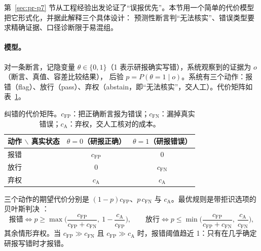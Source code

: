 第~\ref{sec:pr-p7} 节从工程经验出发论证了“误报优先”。本节用一个简单的代价模型把它形式化，并据此解释三个具体设计：
预测性断言判“无法核实”、错误类型要求精确证据、口径诊断限于易混组。

\paragraph{模型。}对一条断言，记隐变量 $\theta\in\{0,1\}$（1 表示研报确实写错），系统观察到的证据为 $o$（断言、真值、容差比较结果），
后验 $p=P(\theta=1\mid o)$。系统有三个动作：报错（flag）、放行（pass）、弃权（abstain，即“无法核实”，交人工）。代价矩阵如表~\ref{tab:rc-cost}。

\begin{table}[t]
\centering
\caption{纠错的代价矩阵。$c_{\text{FP}}$：把正确断言报为错误；$c_{\text{FN}}$：漏掉真实错误；$c_{\text{A}}$：弃权，交人工核对的成本。}
\label{tab:rc-cost}
\small
\begin{tabular}{@{}lcc@{}}
\toprule
动作 $\backslash$ 真实状态 & $\theta=0$（研报正确） & $\theta=1$（研报错误） \\
\midrule
报错 & $c_{\text{FP}}$ & 0 \\
放行 & 0 & $c_{\text{FN}}$ \\
弃权 & $c_{\text{A}}$ & $c_{\text{A}}$ \\
\bottomrule
\end{tabular}
\end{table}

三个动作的期望代价分别是 $(1-p)c_{\text{FP}}$、$p\,c_{\text{FN}}$ 与 $c_{\text{A}}$。最优规则是带拒识选项的贝叶斯判决 \citep{chow1970reject,elkan2001cost}：
\begin{equation}
\text{报错} \iff p \ge \max\Big(\frac{c_{\text{FP}}}{c_{\text{FP}}+c_{\text{FN}}},\ 1-\frac{c_{\text{A}}}{c_{\text{FP}}}\Big),\qquad
\text{放行} \iff p \le \min\Big(\frac{c_{\text{FP}}}{c_{\text{FP}}+c_{\text{FN}}},\ \frac{c_{\text{A}}}{c_{\text{FN}}}\Big),
\label{eq:rc-chow}
\end{equation}
其余情形弃权。当 $c_{\text{FP}}\gg c_{\text{FN}}$ 且 $c_{\text{FP}}\gg c_{\text{A}}$ 时，报错阈值趋近 1：只有在几乎确定研报写错时才报错。

